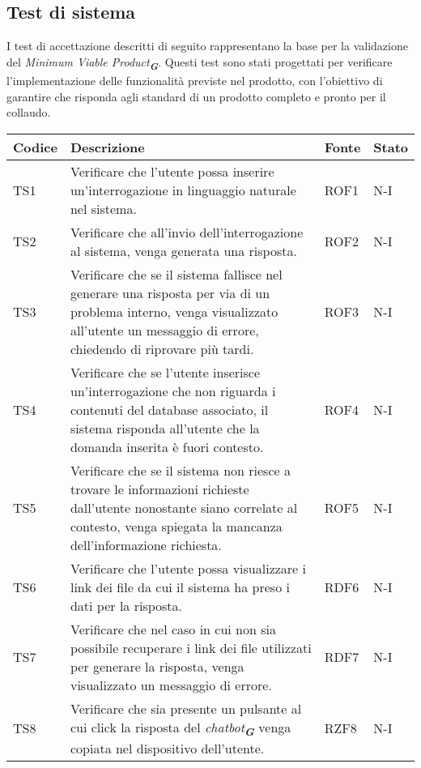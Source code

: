 \newpage

\subsection{Test di sistema}
\label{sec:Test di sistema}
I test di accettazione descritti di seguito rappresentano la base per la validazione del \emph{Minimum Viable Product}\textsubscript{\textit{\textbf{G}}}. Questi test sono stati progettati per verificare l’implementazione delle funzionalità previste nel prodotto, con l’obiettivo di garantire che risponda agli standard di un prodotto completo e pronto per il collaudo.

\begin{table}[h!]
    \centering
    \renewcommand{\arraystretch}{1.5}
    \begin{tabularx}{\textwidth}{|p{}|X|p{}|p{}|}\hline
    \rowcolor[HTML]{FFD700}
    \textbf{Codice} & \textbf{Descrizione} & \textbf{Fonte} & \textbf{Stato} \\ \hline
    TS1 & Verificare che l'utente possa inserire un'interrogazione in linguaggio naturale nel sistema. & ROF1 & N-I \\ \hline
    TS2 & Verificare che all'invio dell'interrogazione al sistema, venga generata una risposta. & ROF2 & N-I \\ \hline
    TS3 & Verificare che se il sistema fallisce nel generare una risposta per via di un problema interno, venga visualizzato all'utente un messaggio di errore, chiedendo di riprovare più tardi. & ROF3 & N-I \\ \hline
    TS4 & Verificare che se l'utente inserisce un'interrogazione che non riguarda i contenuti del database associato, il sistema risponda all'utente che la domanda inserita è fuori contesto. & ROF4 & N-I \\ \hline
    TS5 & Verificare che se il sistema non riesce a trovare le informazioni richieste dall'utente nonostante siano correlate al contesto, venga spiegata la mancanza dell'informazione richiesta. & ROF5 & N-I \\ \hline
    TS6 & Verificare che l'utente possa visualizzare i link dei file da cui il sistema ha preso i dati per la risposta. & RDF6 & N-I \\ \hline
    TS7 & Verificare che nel caso in cui non sia possibile recuperare i link dei file utilizzati per generare la risposta, venga visualizzato un messaggio di errore. & RDF7 & N-I \\ \hline
    TS8 & Verificare che sia presente un pulsante al cui click la risposta del \emph{chatbot}\textsubscript{\textit{\textbf{G}}} venga copiata nel dispositivo dell'utente. & RZF8 & N-I \\ \hline

\end{tabularx}
\end{table}
